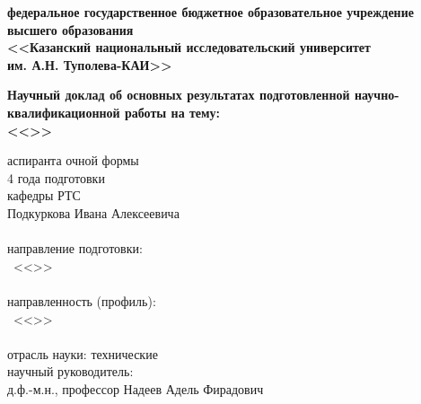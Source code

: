 \thispagestyle{empty}


\begin{center}
\textbf{ 
федеральное государственное бюджетное образовательное учреждение\\ высшего образования\\
<<Казанский национальный исследовательский университет\\им. А.Н. Туполева-КАИ>>}
\end{center}

\vspace{0pt plus1fill} %


\vspace{0pt plus3fill} %

\begin{center}
	\textbf {Научный доклад об основных результатах подготовленной научно-квалификационной работы на тему: \\%
<<\thesisTitle>>}
\end{center}


\vspace{0pt plus3fill} %

\hfill\begin{minipage}[h]{0.5\linewidth}
аспиранта очной формы \\
4 года подготовки\\
кафедры РТС \\
Подкуркова Ивана Алексеевича
\\\\
направление подготовки:\\ \thesisSpecialtyNumber\  <<\thesisSpecialtyTitle>>
\\\\
направленность (профиль):\\ \thesisSpecialtyTwoNumber\  <<\thesisSpecialtyTwoTitle>>
\\\\
отрасль науки: технические \\
научный руководитель: \\
д.ф.-м.н., профессор Надеев Адель Фирадович
\end{minipage}


%
%
%



\vspace{0pt plus4fill} %
{\centering\thesisCity~ \thesisYear\par}

\newpage
